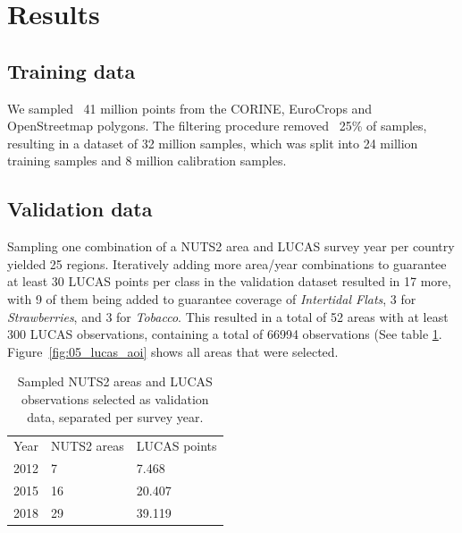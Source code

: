 \section{Results}
    \subsection{Training data}

        We sampled ~41 million points from the CORINE, EuroCrops and OpenStreetmap polygons. The filtering procedure removed ~25\% of samples, resulting in a dataset of 32 million samples, which was split into 24 million training samples and 8 million calibration samples.
    
\subsection{Validation data}

    Sampling one combination of a NUTS2 area and LUCAS survey year per country yielded 25 regions. Iteratively adding more area/year combinations to guarantee at least 30 LUCAS points per class in the validation dataset resulted in 17 more, with 9 of them being added to guarantee coverage of \textit{Intertidal Flats}, 3 for \textit{Strawberries}, and 3 for \textit{Tobacco}. This resulted in a total of 52 areas with at least 300 LUCAS observations, containing a total of 66994 observations (See table \ref{tab:05_lucas_nuts}. Figure~\ref{fig:05_lucas_aoi} shows all areas that were selected.

    \begin{table}[H!]
    \begin{tabular}{lll}
    Year & NUTS2 areas & LUCAS points \\
    2012 & 7           & 7.468        \\
    2015 & 16          & 20.407       \\
    2018 & 29          & 39.119      
    \end{tabular}
    \caption{Sampled NUTS2 areas and LUCAS observations selected as validation data, separated per survey year.}
    \label{tab:05_lucas_nuts}
    \end{table}
    
